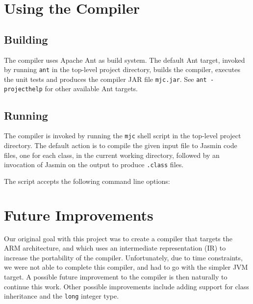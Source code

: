 \documentclass[a4paper,11pt]{article}
\begin{document}
\section{Using the Compiler}
\vspace*{-0.3em}

\label{sec:using}

\subsection{Building}
\vspace*{-0.3em}

The compiler uses Apache Ant as build system. The default Ant target, invoked
by running \texttt{ant} in the top-level project directory, builds the compiler,
executes the unit tests and produces the compiler JAR file \texttt{mjc.jar}. See
\texttt{ant -projecthelp} for other available Ant targets.

\subsection{Running}
\vspace*{-0.3em}

The compiler is invoked by running the \texttt{mjc} shell script in the top-level
project directory. The default action is to compile the given input file to Jasmin
code files, one for each class, in the current working directory, followed by an
invocation of Jasmin on the output to produce \texttt{.class} files.

The script accepts the following command line options:

\begin{alltt}

\end{alltt}
\section{Future Improvements}

\label{sec:improvements}

Our original goal with this project was to create a compiler that targets the
ARM architecture, and which uses an intermediate representation (IR) to increase the
portability of the compiler. Unfortunately, due to time constraints, we were not able
to complete this compiler, and had to go with the simpler JVM target. A possible
future improvement to the compiler is then naturally to continue this work. Other
possible improvements include adding support for class inheritance and the
\texttt{long} integer type.
\end{document}
